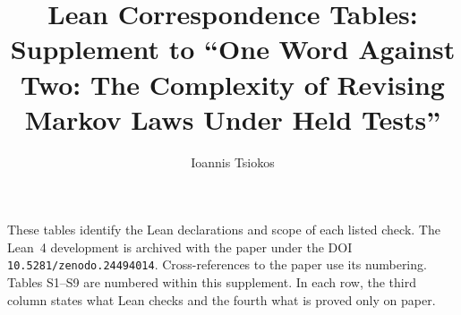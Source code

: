 \documentclass[acmsmall,screen,nonacm]{acmart}
\title{Lean Correspondence Tables: Supplement to ``One Word Against Two: The Complexity of Revising Markov Laws Under Held Tests''}
\author{Ioannis Tsiokos}
\affiliation{%
  \institution{Automorph Inc.}
  \city{Athens}
  \country{Greece}}
\newcommand{\archivedoi}{10.5281/zenodo.24494014}
\begin{document}
\maketitle
\noindent These tables identify the Lean declarations and scope of each
listed check. The Lean~4 development is archived with the paper under the
DOI \texttt{\archivedoi}. Cross-references to the paper use its numbering.
Tables S1--S9 are numbered within this supplement. In each row, the third
column states what Lean checks and the fourth what is proved only on
paper.

\DeclareUrlCommand{}
\newcommand{\lc}{\raggedright\let\\\tabularnewline\hspace{0pt}}
\newcommand{\leanrow}{\addlinespace[2pt]}
\newcommand{\leanhead}{%
  \toprule
  \lc Result & \lc Lean declarations, by file & \lc What Lean checks & \lc Proved only on paper\\
  \midrule}
\end{document}

